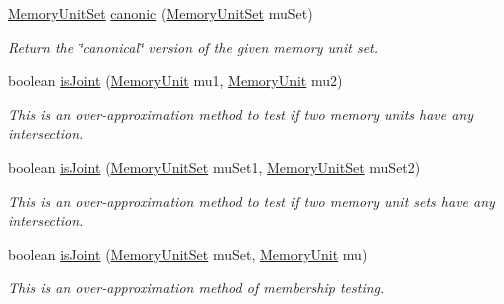 \begin{DoxyCompactItemize}
\item 
\hyperlink{interfaceedu_1_1udel_1_1cis_1_1vsl_1_1civl_1_1state_1_1IF_1_1MemoryUnitSet}{Memory\+Unit\+Set} \hyperlink{interfaceedu_1_1udel_1_1cis_1_1vsl_1_1civl_1_1state_1_1IF_1_1MemoryUnitFactory_a92b22a4500dc9fe09628f1c2c9bcd2fb}{canonic} (\hyperlink{interfaceedu_1_1udel_1_1cis_1_1vsl_1_1civl_1_1state_1_1IF_1_1MemoryUnitSet}{Memory\+Unit\+Set} mu\+Set)
\begin{DoxyCompactList}\small\item\em Return the \char`\"{}canonical\char`\"{} version of the given memory unit set. \end{DoxyCompactList}\item 
boolean \hyperlink{interfaceedu_1_1udel_1_1cis_1_1vsl_1_1civl_1_1state_1_1IF_1_1MemoryUnitFactory_a1f654eef9c72122cb334ecbef1658db1}{is\+Joint} (\hyperlink{interfaceedu_1_1udel_1_1cis_1_1vsl_1_1civl_1_1state_1_1IF_1_1MemoryUnit}{Memory\+Unit} mu1, \hyperlink{interfaceedu_1_1udel_1_1cis_1_1vsl_1_1civl_1_1state_1_1IF_1_1MemoryUnit}{Memory\+Unit} mu2)
\begin{DoxyCompactList}\small\item\em This is an over-\/approximation method to test if two memory units have any intersection. \end{DoxyCompactList}\item 
boolean \hyperlink{interfaceedu_1_1udel_1_1cis_1_1vsl_1_1civl_1_1state_1_1IF_1_1MemoryUnitFactory_aaf39bdf7b5a765f3912aac91c88bebb5}{is\+Joint} (\hyperlink{interfaceedu_1_1udel_1_1cis_1_1vsl_1_1civl_1_1state_1_1IF_1_1MemoryUnitSet}{Memory\+Unit\+Set} mu\+Set1, \hyperlink{interfaceedu_1_1udel_1_1cis_1_1vsl_1_1civl_1_1state_1_1IF_1_1MemoryUnitSet}{Memory\+Unit\+Set} mu\+Set2)
\begin{DoxyCompactList}\small\item\em This is an over-\/approximation method to test if two memory unit sets have any intersection. \end{DoxyCompactList}\item 
boolean \hyperlink{interfaceedu_1_1udel_1_1cis_1_1vsl_1_1civl_1_1state_1_1IF_1_1MemoryUnitFactory_ad25e0cb6162a6fe07379609bc5433743}{is\+Joint} (\hyperlink{interfaceedu_1_1udel_1_1cis_1_1vsl_1_1civl_1_1state_1_1IF_1_1MemoryUnitSet}{Memory\+Unit\+Set} mu\+Set, \hyperlink{interfaceedu_1_1udel_1_1cis_1_1vsl_1_1civl_1_1state_1_1IF_1_1MemoryUnit}{Memory\+Unit} mu)
\begin{DoxyCompactList}\small\item\em This is an over-\/approximation method of membership testing. \end{DoxyCompactList}\item 

\end{DoxyCompactItemize}
